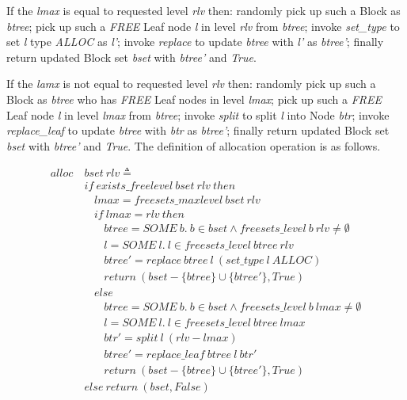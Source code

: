 If the \emph{lmax} is equal to requested level \emph{rlv} then: randomly pick up such a Block as \emph{btree}; pick up such a \emph{FREE} Leaf node \emph{l} in level \emph{rlv} from \emph{btree}; invoke \emph{set\_type} to set \emph{l} type \emph{ALLOC} as \emph{l'}; invoke \emph{replace} to update \emph{btree} with \emph{l'} as \emph{btree'}; finally return updated Block set \emph{bset} with \emph{btree'} and \emph{True}.

If the \emph{lamx} is not equal to requested level \emph{rlv} then: randomly pick up such a Block as \emph{btree} who has \emph{FREE} Leaf nodes in level \emph{lmax}; pick up such a \emph{FREE} Leaf node \emph{l} in level \emph{lmax} from \emph{btree}; invoke \emph{split} to split \emph{l} into Node \emph{btr}; invoke \emph{replace\_leaf} to update \emph{btree} with \emph{btr} as \emph{btree'}; finally return updated Block set \emph{bset} with \emph{btree'} and \emph{True}. The definition of allocation operation is as follows.

\begin{definition} 
\end{definition}
\vspace{-7pt}
{\footnotesize
\begin{align*}
alloc\ &bset\ rlv \triangleq \\
&if\ exists\_freelevel\ bset\ rlv\ then \\
&\ \ \ \ lmax = freesets\_maxlevel\ bset\ rlv \\
&\ \ \ \ if\ lmax = rlv\ then \\
&\ \ \ \ \ \ \ \ btree = SOME\ b.\ b \in bset \wedge freesets\_level\ b\ rlv \ne \emptyset \\
&\ \ \ \ \ \ \ \ l = SOME\ l.\ l \in freesets\_level\ btree\ rlv \\
&\ \ \ \ \ \ \ \ btree' = replace\ btree\ l\ (set\_type\ l\ ALLOC) \\
&\ \ \ \ \ \ \ \ return\ (bset - \lbrace btree \rbrace \cup \lbrace btree' \rbrace, True) \\
&\ \ \ \ else \\
&\ \ \ \ \ \ \ \ btree = SOME\ b.\ b \in bset \wedge freesets\_level\ b\ lmax \ne \emptyset \\
&\ \ \ \ \ \ \ \ l = SOME\ l.\ l \in freesets\_level\ btree\ lmax \\
&\ \ \ \ \ \ \ \ btr' = split\ l\ (rlv - lmax) \\
&\ \ \ \ \ \ \ \ btree' = replace\_leaf\ btree\ l\ btr' \\
&\ \ \ \ \ \ \ \ return\ (bset - \lbrace btree \rbrace \cup \lbrace btree' \rbrace, True) \\
&else\ return\ (bset, False)
\end{align*}
}
\vspace{-17pt}

